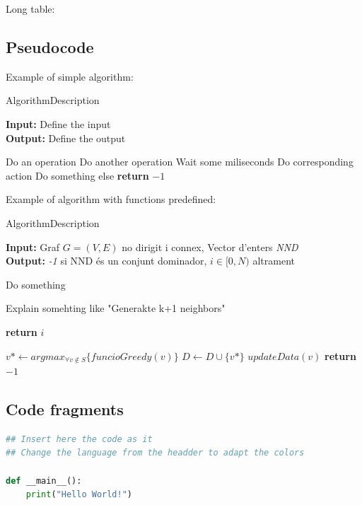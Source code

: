 Long table:
\begin{table}[H]
  \centering
  \caption{Caption}
  \label{tab:label}
\end{table}

\clearpage
\subsection{Pseudocode}

Example of simple algorithm:
\begin{algorithm}[H]
  \caption{AlgorithmDescription}
  \label{alg:label}
  \textbf{Input:} Define the input\\
  \textbf{Output:} Define the output

  \begin{algorithmic}[1]
    \STATE Do an operation
    \STATE Do another operation
    \STATE Wait some miliseconds
    \STATE Do corresponding action
    \ENDIF
    \STATE Do something else
    \STATE \textbf{return} $-1$
  \end{algorithmic}
\end{algorithm}

Example of algorithm with functions predefined:

\begin{algorithm}[H]
  \caption{AlgorithmDescription}
  \label{alg:label}
  \textbf{Input:} Graf $G = (V, E)$ no dirigit i connex, Vector
  d'enters \emph{NND}\\
  \textbf{Output:} \emph{-1} si NND és un conjunt dominador, $i \in
  [0, N)$ altrament
  \begin{algorithmic}[1]
    \FOR{each $i \in [0, N)$}
    \STATE Do something
    \ENDFOR

    \STATE Explain somehting like "Generakte k+1 neighbors"

    \STATE \textbf{return} $i$
    \ENDIF

    \STATE $v* \leftarrow arg max_{\forall v \not\in S } \{funcioGreedy(v)\}$
    \STATE $D \leftarrow  D  \cup  \{v*\}$
    \STATE $updateData(v)$
    \ENDWHILE
    \STATE \textbf{return} $-1$
  \end{algorithmic}
\end{algorithm}

\subsection{Code fragments}
\begin{lstlisting}[language=Python, caption={CaptionPythonCode}, label={code:label}]
## Insert here the code as it
## Change the language from the headder to adapt the colors

def __main__():
    print("Hello World!")
\end{lstlisting}
